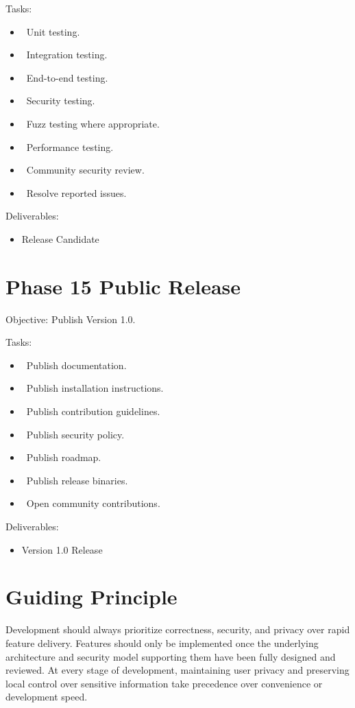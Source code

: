 Tasks:
\begin{itemize}
	\item[] \checkbox\ Unit testing.
	\item[] \checkbox\ Integration testing.
	\item[] \checkbox\ End-to-end testing.
	\item[] \checkbox\ Security testing.
	\item[] \checkbox\ Fuzz testing where appropriate.
	\item[] \checkbox\ Performance testing.
	\item[] \checkbox\ Community security review.
	\item[] \checkbox\ Resolve reported issues.
\end{itemize}

Deliverables:
\begin{itemize}
	\item Release Candidate
\end{itemize}
\section{Phase 15 Public Release}
Objective: Publish Version 1.0.

Tasks:
\begin{itemize}
	\item[] \checkbox\ Publish documentation.
	\item[] \checkbox\ Publish installation instructions.
	\item[] \checkbox\ Publish contribution guidelines.
	\item[] \checkbox\ Publish security policy.
	\item[] \checkbox\ Publish roadmap.
	\item[] \checkbox\ Publish release binaries.
	\item[] \checkbox\ Open community contributions.
\end{itemize}

Deliverables:
\begin{itemize}
	\item Version 1.0 Release
\end{itemize}
\section{Guiding Principle}
Development should always prioritize correctness, security, and privacy over rapid feature delivery. Features should only be implemented once the underlying architecture and security model supporting them have been fully designed and reviewed. At every stage of development, maintaining user privacy and preserving local control over sensitive information take precedence over convenience or development speed.

\sentinelchapterend
